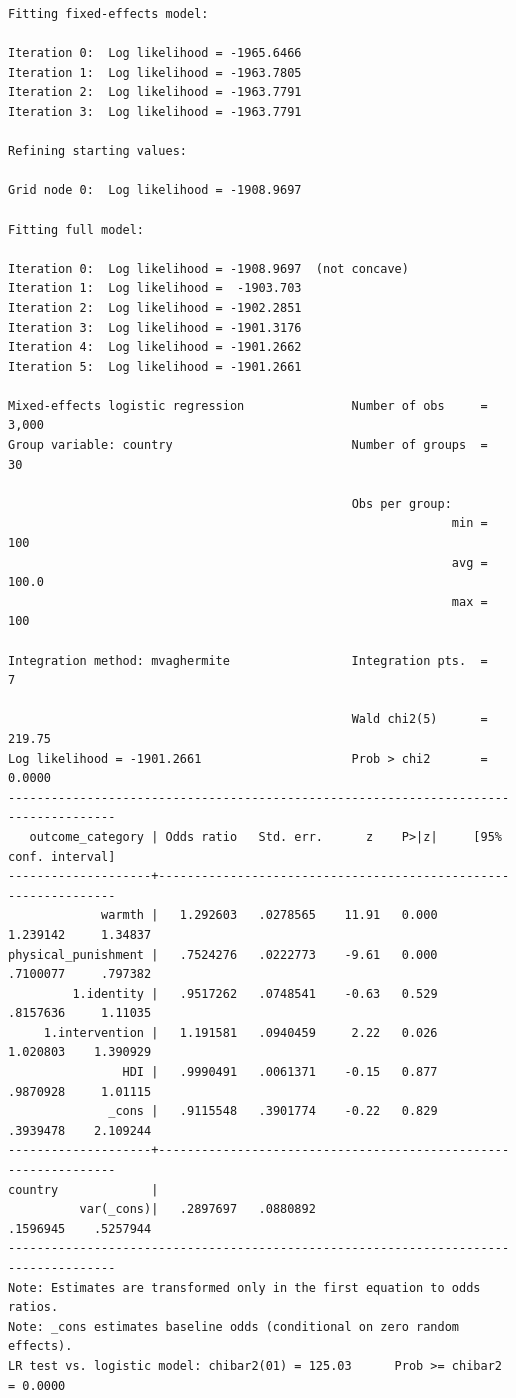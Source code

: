 \documentclass[
  letterpaper,
  DIV=11,
  numbers=noendperiod]{scrreprt}
\begin{document}
\begin{verbatim}
Fitting fixed-effects model:

Iteration 0:  Log likelihood = -1965.6466  
Iteration 1:  Log likelihood = -1963.7805  
Iteration 2:  Log likelihood = -1963.7791  
Iteration 3:  Log likelihood = -1963.7791  

Refining starting values:

Grid node 0:  Log likelihood = -1908.9697

Fitting full model:

Iteration 0:  Log likelihood = -1908.9697  (not concave)
Iteration 1:  Log likelihood =  -1903.703  
Iteration 2:  Log likelihood = -1902.2851  
Iteration 3:  Log likelihood = -1901.3176  
Iteration 4:  Log likelihood = -1901.2662  
Iteration 5:  Log likelihood = -1901.2661  

Mixed-effects logistic regression               Number of obs     =      3,000
Group variable: country                         Number of groups  =         30

                                                Obs per group:
                                                              min =        100
                                                              avg =      100.0
                                                              max =        100

Integration method: mvaghermite                 Integration pts.  =          7

                                                Wald chi2(5)      =     219.75
Log likelihood = -1901.2661                     Prob > chi2       =     0.0000
-------------------------------------------------------------------------------------
   outcome_category | Odds ratio   Std. err.      z    P>|z|     [95% conf. interval]
--------------------+----------------------------------------------------------------
             warmth |   1.292603   .0278565    11.91   0.000     1.239142     1.34837
physical_punishment |   .7524276   .0222773    -9.61   0.000     .7100077     .797382
         1.identity |   .9517262   .0748541    -0.63   0.529     .8157636     1.11035
     1.intervention |   1.191581   .0940459     2.22   0.026     1.020803    1.390929
                HDI |   .9990491   .0061371    -0.15   0.877     .9870928     1.01115
              _cons |   .9115548   .3901774    -0.22   0.829     .3939478    2.109244
--------------------+----------------------------------------------------------------
country             |
          var(_cons)|   .2897697   .0880892                      .1596945    .5257944
-------------------------------------------------------------------------------------
Note: Estimates are transformed only in the first equation to odds ratios.
Note: _cons estimates baseline odds (conditional on zero random effects).
LR test vs. logistic model: chibar2(01) = 125.03      Prob >= chibar2 = 0.0000
\end{verbatim}
\end{document}
